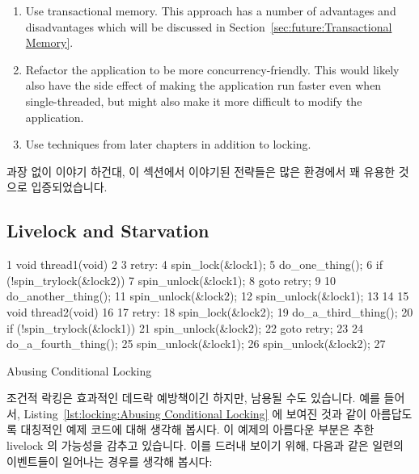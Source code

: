 {\begin{enumerate}
	\item	Use transactional memory.
		This approach has a number of advantages and disadvantages
		which will be discussed in
		Section~\ref{sec:future:Transactional Memory}.
	\item	Refactor the application to be more concurrency-friendly.
		This would likely also have the side effect of making
		the application run faster even when single-threaded, but might
		also make it more difficult to modify the application.
	\item	Use techniques from later chapters in addition to locking.
	\fi
	\end{enumerate}
} \QuickQuizEnd

과장 없이 이야기 하건대, 이 섹션에서 이야기된 전략들은 많은 환경에서 꽤 유용한
것으로 입증되었습니다.

\subsection{Livelock and Starvation}
\label{sec:locking:Livelock and Starvation}

\begin{listing}[tbp]
{ \scriptsize
\begin{verbbox}
  1 void thread1(void)
  2 {
  3 retry:
  4   spin_lock(&lock1);
  5   do_one_thing();
  6   if (!spin_trylock(&lock2)) {
  7     spin_unlock(&lock1);
  8     goto retry;
  9   }
 10   do_another_thing();
 11   spin_unlock(&lock2);
 12   spin_unlock(&lock1);
 13 }
 14 
 15 void thread2(void)
 16 {
 17 retry:
 18   spin_lock(&lock2);
 19   do_a_third_thing();
 20   if (!spin_trylock(&lock1)) {
 21     spin_unlock(&lock2);
 22     goto retry;
 23   }
 24   do_a_fourth_thing();
 25   spin_unlock(&lock1);
 26   spin_unlock(&lock2);
 27 }
\end{verbbox}
}
\centering
\theverbbox
\caption{Abusing Conditional Locking}
\label{lst:locking:Abusing Conditional Locking}
\end{listing}

조건적 락킹은 효과적인 데드락 예방책이긴 하지만, 남용될 수도 있습니다.
예를 들어서, Listing~\ref{lst:locking:Abusing Conditional Locking} 에 보여진
것과 같이 아름답도록 대칭적인 예제 코드에 대해 생각해 봅시다.
이 예제의 아름다운 부분은 추한 livelock 의 가능성을 감추고 있습니다.
이를 드러내 보이기 위해, 다음과 같은 일련의 이벤트들이 일어나는 경우를 생각해
봅시다:
\iffalse

